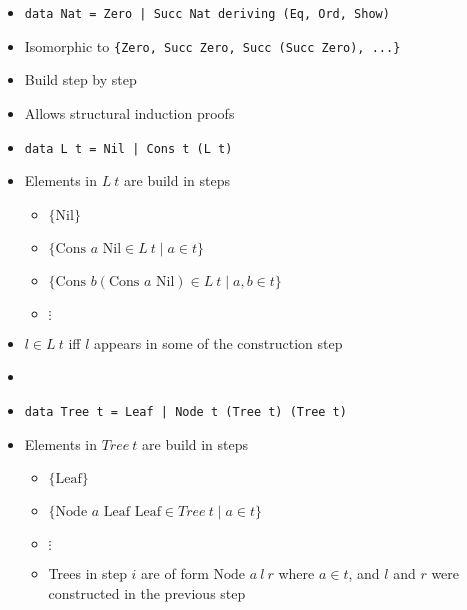 \begin{itemize}
        \begin{itemize}
            \item \verb+data Nat = Zero | Succ Nat deriving (Eq, Ord, Show)+
            \item Isomorphic to \verb+{Zero, Succ Zero, Succ (Succ Zero), ...}+
            \item Build step by step
            \item Allows structural induction proofs
        \end{itemize}
        \begin{itemize}
            \item \verb+data L t = Nil | Cons t (L t)+
            \item Elements in $L \ t$ are build in steps
                \begin{itemize}
                    \item $\{\text{Nil}\}$
                    \item $\{\text{Cons } a \text{ Nil} \in L \ t \mid a \in t\}$
                    \item $\{\text{Cons } b (\text{Cons } a \text{ Nil}) \in L \ t \mid a,b \in t\}$
                    \item $\vdots$
                \end{itemize}
            \item $l \in L \ t$ iff $l$ appears in some of the construction step
            \item {}
        \end{itemize}
        \begin{itemize}
            \item \verb+data Tree t = Leaf | Node t (Tree t) (Tree t)+
            \item Elements in $Tree \ t$ are build in steps
                \begin{itemize}
                    \item $\{\text{Leaf}\}$
                    \item $\{\text{Node } a \text{ Leaf Leaf} \in Tree \ t \mid a \in t\}$
                    \item $\vdots$
                    \item Trees in step $i$ are of form $\text{Node }a \ l \ r$ where $a \in t$, and $l$ and $r$ were constructed in the previous step
                \end{itemize}

\end{itemize}
\end{itemize}
